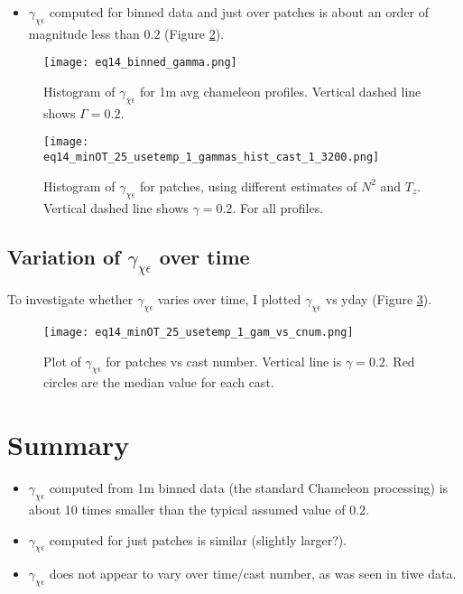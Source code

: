 \documentclass[11pt]{article}
\begin{document}
\begin{itemize}
\item $\gamma_{\chi\epsilon}$ computed for binned data and just over patches is about an order of magnitude less than $0.2$ (Figure \ref{patchgam}).
\end{itemize}


\begin{figure}[htbp]
\texttt{[image: eq14\_binned\_gamma.png]}
\caption{Histogram of $\gamma_{\chi\epsilon}$ for 1m avg chameleon profiles. Vertical dashed line shows $\Gamma=0.2$.}
\label{avggam}
\end{figure}

\begin{figure}[htbp]
\texttt{[image: eq14\_minOT\_25\_usetemp\_1\_gammas\_hist\_cast\_1\_3200.png]}
\caption{Histogram of $\gamma_{\chi\epsilon}$ for patches, using different estimates of $N^2$ and $T_z$. Vertical dashed line shows $\gamma=0.2$. For all profiles.}
\label{patchgam}
\end{figure}




\clearpage
\subsection{Variation of $\gamma_{\chi\epsilon}$ over time}

To investigate whether $\gamma_{\chi\epsilon}$ varies over time, I plotted $\gamma_{\chi\epsilon}$ vs yday (Figure \ref{gamvscnum}).

\begin{figure}[htbp]
\texttt{[image: eq14\_minOT\_25\_usetemp\_1\_gam\_vs\_cnum.png]}
\caption{Plot of $\gamma_{\chi\epsilon}$ for patches vs cast number. Vertical line is $\gamma=0.2$. Red circles are the median value for each cast.}
\label{gamvscnum}
\end{figure}






\clearpage
\section{Summary}

\begin{itemize}
\item $\gamma_{\chi\epsilon}$ computed from 1m binned data (the standard Chameleon processing) is about 10 times smaller than the typical assumed value of 0.2.
\item $\gamma_{\chi\epsilon}$ computed for just patches is similar (slightly larger?).
\item $\gamma_{\chi\epsilon}$ does not appear to vary over time/cast number, as was seen in tiwe data.
\end{itemize}
\end{document}
